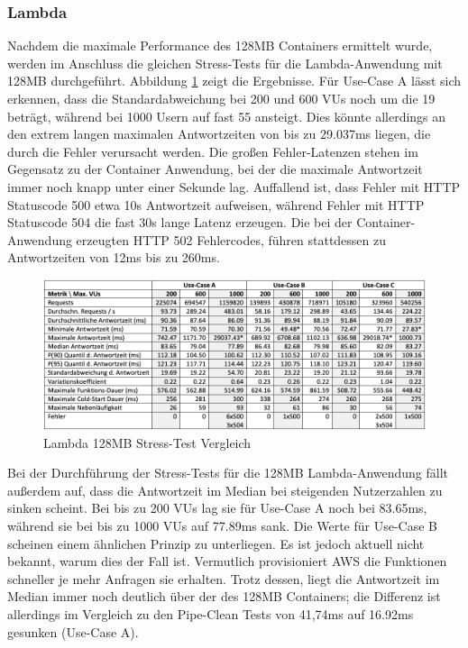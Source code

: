 \subsubsection{Lambda}
Nachdem die maximale Performance des 128MB Containers ermittelt wurde, werden im Anschluss die gleichen Stress-Tests für die Lambda-Anwendung mit 128MB durchgeführt. Abbildung \ref{fig:lambda128-stress-comparison} zeigt die Ergebnisse. Für Use-Case A lässt sich erkennen, dass die Standardabweichung bei 200 und 600 VUs noch um die 19 beträgt, während bei 1000 Usern auf fast 55 ansteigt. Dies könnte allerdings an den extrem langen maximalen Antwortzeiten von bis zu 29.037ms liegen, die durch die Fehler verursacht werden. Die großen Fehler-Latenzen stehen im Gegensatz zu der Container Anwendung, bei der die maximale Antwortzeit immer noch knapp unter einer Sekunde lag. Auffallend ist, dass Fehler mit HTTP Statuscode 500 etwa 10s Antwortzeit aufweisen, während Fehler mit HTTP Statuscode 504 die fast 30s lange Latenz erzeugen. Die bei der Container-Anwendung erzeugten HTTP 502 Fehlercodes, führen stattdessen zu  Antwortzeiten von 12ms bis zu 260ms. 

\begin{figure}[H]
    \includegraphics[width=\textwidth]{img/lambda128-stress-comparison.png}
    \caption[Lambda 128MB Stress-Test Vergleich]{Lambda 128MB Stress-Test Vergleich}
    \label{fig:lambda128-stress-comparison}
\end{figure}

Bei der Durchführung der Stress-Tests für die 128MB Lambda-Anwendung fällt außerdem auf, dass die Antwortzeit im Median bei steigenden Nutzerzahlen zu sinken scheint. Bei bis zu 200 VUs lag sie für Use-Case A noch bei 83.65ms, während sie bei bis zu 1000 VUs auf 77.89ms sank. Die Werte für Use-Case B scheinen einem ähnlichen Prinzip zu unterliegen. Es ist jedoch aktuell nicht bekannt, warum dies der Fall ist. Vermutlich provisioniert AWS die Funktionen schneller je mehr Anfragen sie erhalten. Trotz dessen, liegt die Antwortzeit im Median immer noch deutlich über der des 128MB Containers; die Differenz ist allerdings im Vergleich zu den Pipe-Clean Tests von 41,74ms auf 16.92ms gesunken (Use-Case A).

